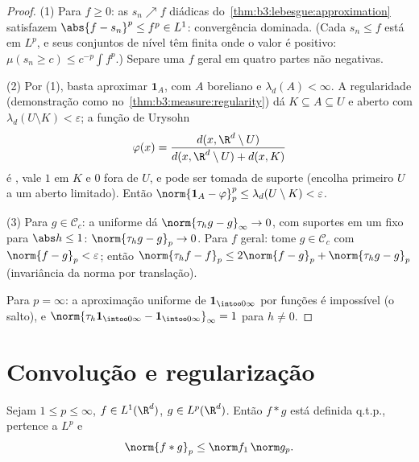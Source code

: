 \begin{proof}
(1) Para $f \geq 0$: as $s_n \nearrow f$ diádicas do~\cref{thm:b3:lebesgue:approximation} satisfazem $\abs{f - s_n}^p
\leq f^p \in L^1$:
convergência dominada. (Cada $s_n \leq f$ está em $L^p$, e seus conjuntos
de nível têm  finita onde o valor é positivo: $\mu(s_n \geq c) \leq c^{-p}\int f^p$.) Separe uma
$f$ geral em quatro partes não negativas.

(2) Por (1), basta aproximar $\mathbf 1_A$, com $A$ boreliano e $\lambda_d(A) < \infty$. A
regularidade (demonstração como no~\cref{thm:b3:measure:regularity}) dá $K \subseteq A
\subseteq U$  e
aberto com $\lambda_d(U\setminus K) <
\varepsilon$; a função de Urysohn
\[
\varphi(x) = \frac{d(x, \R^d\setminus U)}{d(x, \R^d\setminus U)
+ d(x, K)}
\]
é , vale $1$ em $K$ e $0$ fora de $U$, e pode ser
tomada de suporte  (encolha primeiro $U$ a um aberto
limitado). Então $\norm{\mathbf 1_A - \varphi}_p^p \leq \lambda_d(U\setminus K)
< \varepsilon$.

(3) Para $g \in \mathcal C_c$: a  uniforme dá $\norm{\tau_hg - g}_\infty \to 0$, com suportes em um
 fixo para $\abs h \leq 1$: $\norm{\tau_hg - g}_p \to 0$. Para $f$ geral: tome $g \in \mathcal C_c$ com
$\norm{f - g}_p <
\varepsilon$; então $\norm{\tau_hf - f}_p \leq 2\norm{f - g}_p +
\norm{\tau_hg - g}_p$ (invariância da norma por translação).

Para $p = \infty$: a aproximação uniforme de $\mathbf
1_{\intoo0\infty}$ por funções  é
impossível (o salto), e $\norm{\tau_h\mathbf 1_{\intoo0\infty} - \mathbf
1_{\intoo0\infty}}_\infty = 1$ para $h \neq 0$.
\end{proof}

\section{Convolução e regularização}

\begin{theorem}\label{thm:b3:lp:young}
Sejam $1 \leq p \leq \infty$, $f \in L^1(\R^d)$, $g \in
L^p(\R^d)$. Então $f * g$ está definida q.t.p.,
pertence a $L^p$ e
\[
\norm{f * g}_p \leq \norm f_1\,\norm g_p .
\]
\end{theorem}


